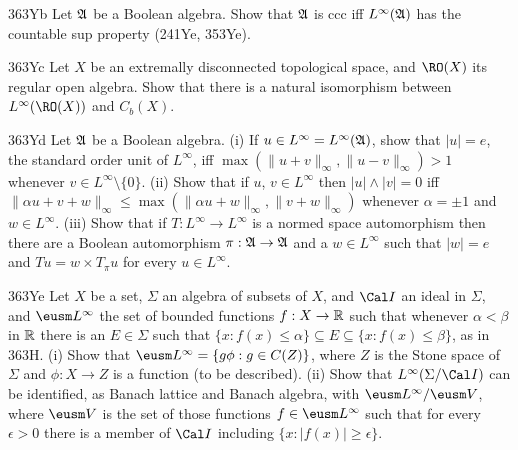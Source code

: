 {\spheader 363Yb Let $\frak A$ be a Boolean algebra.   Show that
$\frak A$ is ccc iff $L^{\infty}(\frak A)$ has the countable sup
property (241Ye, 353Ye).

\spheader 363Yc Let $X$ be an extremally disconnected topological space,
and $\RO(X)$ its regular open algebra.   Show that there is a natural
isomorphism between $L^{\infty}(\RO(X))$ and $C_b(X)$.

\spheader 363Yd Let $\frak A$ be a Boolean algebra.   (i) If
$u\in L^{\infty}=L^{\infty}(\frak A)$, show that $|u|=e$, the standard
order unit
of $L^{\infty}$, iff $\max(\|u+v\|_{\infty},\|u-v\|_{\infty})>1$
whenever $v\in L^{\infty}\setminus\{0\}$.   (ii) Show that if $u$,
$v\in L^{\infty}$ then $|u|\wedge|v|=0$ iff $\|\alpha u+v+w\|_{\infty}
\le\max(\|\alpha u+w\|_{\infty},\|v+w\|_{\infty})$ whenever
$\alpha=\pm 1$ and $w\in L^{\infty}$.
(iii) Show that if $T:L^{\infty}\to L^{\infty}$ is a normed space
automorphism then there are a Boolean automorphism
$\pi:\frak A\to\frak A$ and
a $w\in L^{\infty}$ such that $|w|=e$ and $Tu=w\times T_{\pi}u$ for
every $u\in L^{\infty}$.

\spheader 363Ye Let $X$ be a set, $\Sigma$ an algebra of subsets of $X$,
and $\Cal I$ an ideal in $\Sigma$, and
$\eusm L^{\infty}$ the set of bounded functions $f:X\to\Bbb R$ such that
whenever $\alpha<\beta$ in $\Bbb R$ there is an $E\in\Sigma$ such that
$\{x:f(x)\le\alpha\}\subseteq E\subseteq\{x:f(x)\le\beta\}$, as in 363H.   
(i) Show
that $\eusm L^{\infty}=\{g\phi:g\in C(Z)\}$, where $Z$ is the Stone
space of $\Sigma$ and $\phi:X\to Z$ is a function (to be described).
(ii) Show
that $L^{\infty}(\Sigma/\Cal I)$ can be identified, as Banach lattice
and Banach algebra, with $\eusm L^{\infty}/\eusm V$, where $\eusm V$ is
the set of those functions $f\in\eusm L^{\infty}$ such that for every
$\epsilon>0$ there is a member of $\Cal I$ including
$\{x:|f(x)|\ge\epsilon\}$.

}
